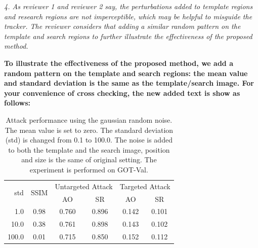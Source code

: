 \documentclass[12pt]{article}
\begin{document}
\textit{4. As reviewer 1 and reviewer 2 say, the perturbations added to template regions and research regions are not imperceptible, which may be helpful to misguide the tracker. The reviewer considers that adding a similar random pattern on the template and search regions to further illustrate the effectiveness of the proposed method.}

\textbf{To illustrate the effectiveness of the proposed method, we add a random pattern on the template and search regions: the mean value and standard deviation is the same as the template/search image.
For your convenience of cross checking, the new added text is show as follows:
}

\begin{table}[t]
  \centering
  \caption{Attack performance using the gaussian random noise. The mean value is set to zero. The standard deviation (std) is changed from 0.1 to 100.0. The noise is added to both the template and the search image, position and size is the same of original setting. The experiment is performed on GOT-Val.}
  \begin{tabular}{@{}rccccc@{}}
  \toprule
  \multirow{2}{*}[-2pt]{std} & \multirow{2}{*}[-2pt]{SSIM}& \multicolumn{2}{c}{Untargeted Attack} & \multicolumn{2}{c}{Targeted Attack} \\ \cmidrule{3-6}
                             &                            & AO                & SR                & AO               & SR               \\ \midrule
  1.0                        & 0.98                       & 0.760             & 0.896             & 0.142            & 0.101            \\
  10.0                       & 0.38                       & 0.761             & 0.898             & 0.143            & 0.102            \\
  100.0                      & 0.01                       & 0.715             & 0.850             & 0.152            & 0.112            \\ \bottomrule        
  \end{tabular}
  \label{table:noise}
\end{table}
\end{document}
